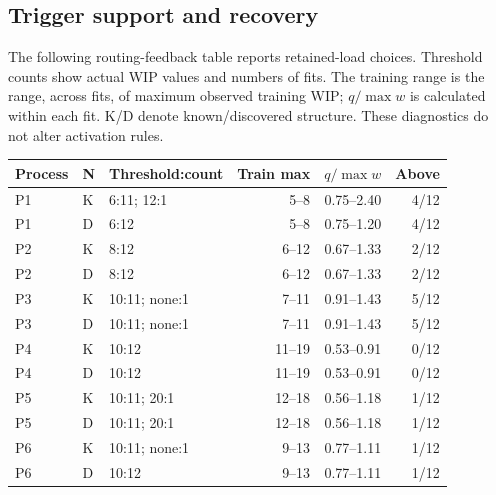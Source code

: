 \clearpage

\subsection{Trigger support and recovery}

The following routing-feedback table reports retained-load choices. Threshold counts show actual WIP values and numbers of fits. The training range is the range, across fits, of maximum observed training WIP; $q/\max w$ is calculated within each fit. K/D denote known/discovered structure. These diagnostics do not alter activation rules.

\begin{center}\small\setlength{\tabcolsep}{3pt}\begin{tabular}{llp{}rrr}\toprule

Process & N & Threshold:count & Train max & $q/\max w$ & Above\\\midrule

P1 & K & 6:11; 12:1 & 5--8 & 0.75--2.40 & 4/12\\

P1 & D & 6:12 & 5--8 & 0.75--1.20 & 4/12\\

P2 & K & 8:12 & 6--12 & 0.67--1.33 & 2/12\\

P2 & D & 8:12 & 6--12 & 0.67--1.33 & 2/12\\

P3 & K & 10:11; none:1 & 7--11 & 0.91--1.43 & 5/12\\

P3 & D & 10:11; none:1 & 7--11 & 0.91--1.43 & 5/12\\

P4 & K & 10:12 & 11--19 & 0.53--0.91 & 0/12\\

P4 & D & 10:12 & 11--19 & 0.53--0.91 & 0/12\\

P5 & K & 10:11; 20:1 & 12--18 & 0.56--1.18 & 1/12\\

P5 & D & 10:11; 20:1 & 12--18 & 0.56--1.18 & 1/12\\

P6 & K & 10:11; none:1 & 9--13 & 0.77--1.11 & 1/12\\

P6 & D & 10:12 & 9--13 & 0.77--1.11 & 1/12\\

\bottomrule\end{tabular}\end{center}

